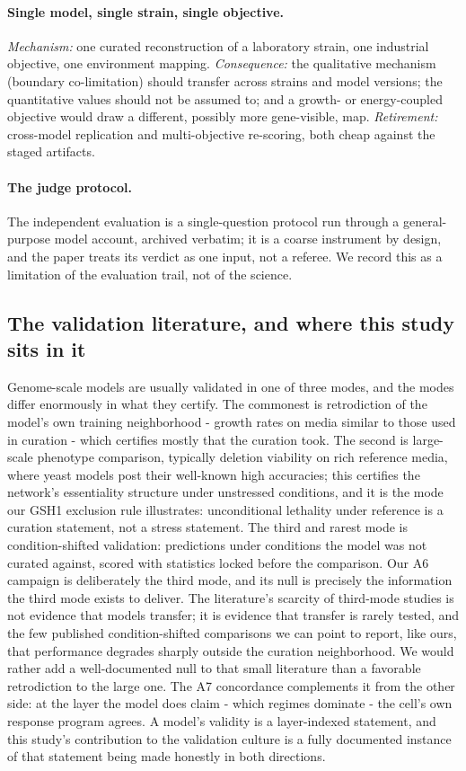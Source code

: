 \documentclass[12pt]{article}
\begin{document}
\paragraph{Single model, single strain, single objective.}
\emph{Mechanism:} one curated reconstruction of a laboratory strain,
one industrial objective, one environment mapping. \emph{Consequence:}
the qualitative mechanism (boundary co-limitation) should transfer
across strains and model versions; the quantitative values should not
be assumed to; and a growth- or energy-coupled objective would draw a
different, possibly more gene-visible, map. \emph{Retirement:}
cross-model replication and multi-objective re-scoring, both cheap
against the staged artifacts.

\paragraph{The judge protocol.} The independent evaluation is a
single-question protocol run through a general-purpose model account,
archived verbatim; it is a coarse instrument by design, and the paper
treats its verdict as one input, not a referee. We record this as a
limitation of the evaluation trail, not of the science.

\subsection{The validation literature, and where this study sits in it}

Genome-scale models are usually validated in one of three modes, and
the modes differ enormously in what they certify. The commonest is
retrodiction of the model's own training neighborhood - growth rates
on media similar to those used in curation - which certifies mostly
that the curation took. The second is large-scale phenotype
comparison, typically deletion viability on rich reference media,
where yeast models post their well-known high accuracies; this
certifies the network's essentiality structure under unstressed
conditions, and it is the mode our GSH1 exclusion rule illustrates:
unconditional lethality under reference is a curation statement, not
a stress statement. The third and rarest mode is condition-shifted
validation: predictions under conditions the model was not curated
against, scored with statistics locked before the comparison. Our A6
campaign is deliberately the third mode, and its null is precisely
the information the third mode exists to deliver. The literature's
scarcity of third-mode studies is not evidence that models transfer;
it is evidence that transfer is rarely tested, and the few published
condition-shifted comparisons we can point to report, like ours, that
performance degrades sharply outside the curation neighborhood. We
would rather add a well-documented null to that small literature than
a favorable retrodiction to the large one. The A7 concordance
complements it from the other side: at the layer the model does
claim - which regimes dominate - the cell's own response program
agrees. A model's validity is a layer-indexed statement, and this
study's contribution to the validation culture is a fully documented
instance of that statement being made honestly in both directions.
\end{document}

